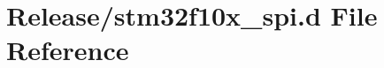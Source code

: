 \hypertarget{stm32f10x__spi_8d}{}\section{Release/stm32f10x\+\_\+spi.d File Reference}
\label{stm32f10x__spi_8d}
